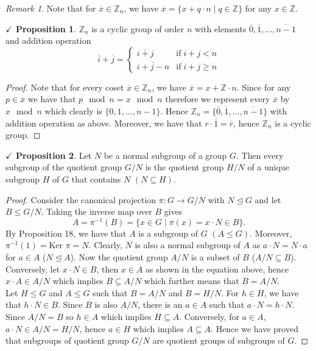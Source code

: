 \documentclass{article}
\theoremstyle{definition}
\theoremstyle{remark}
\newtheorem*{remark}{Remark}
\theoremstyle{definition}
\theoremstyle{definition}
\newtheorem{proposition}{$\checkmark$ Proposition}
\theoremstyle{definition}
\theoremstyle{proof}
\newcommand{\inv}[1]{#1^{-1}}
\newcommand{\kernel}[0]{\text{Ker }}
\newcommand{\nsg}[0]{\trianglelefteq}
\begin{document}
\begin{remark}
	Note that for $ \overline{x} \in \mathbb{Z}_n $, we have $ \overline{x} = \{x+q\cdot n\;\vert\; q\in \mathbb{Z}\} $ for any $ x \in \mathbb{Z} $.
\end{remark}
\hrulefill
\begin{proposition}
	$ \mathbb{Z}_n $ is a cyclic group  of order $ n $ with elements $ \overline{0}, \overline{1}, \dots, \overline{n-1} $ and addition operation
	\[\overline{i} + \overline{j} = \begin{cases}
		\overline{i+j}&\text{if} \;i+j < n\\
		\overline{i+j-n}&\text{if}\; i+j\ge n
	\end{cases}\]
\end{proposition}
\begin{proof}
	Note that for every coset $ \overline{x} \in \mathbb{Z}_n $, we have $ \overline{x} = x + \mathbb{Z}\cdot n $. Since for any $ p \in \overline{x} $ we have that $ p\mod n = x\mod n $ therefore we represent every $ \overline{x} $ by $ x\mod n $ which clearly is $ \{0,1,\dots,n-1\} $. Hence $ \mathbb{Z}_n =  \{\overline{0}, \overline{1}, \dots, \overline{n-1} \} $ with addition operation as above. Moreover, we have that $ r\cdot \overline{1} = \overline{r} $, hence $ \mathbb{Z}_n $ is a cyclic group.
\end{proof}
\hrulefill
\begin{proposition}
	Let $ N $ be a normal subgroup of a group $ G $. Then every subgroup of the quotient group $ G/N $ is the quotient group $ H/N $ of a unique subgroup $ H $ of $ G $ that contains $ N $ $ (N\subseteq H) $.
\end{proposition}
\begin{proof}
	Consider the canonical projection $ \pi : G\to G/N $ with $ N \nsg G $ and let $ B \le G/N $. Taking the inverse map over $ B $ gives
	\[A = \inv{\pi}(B) = \{x\in G \;\vert\; \pi(x) = x\cdot N\in B \}.\]
	By Proposition 18, we have that $ A $ is a subgroup of $ G $ $ (A\le G) $. Moreover, $ \inv{\pi}(1) = \kernel\pi = N $. Clearly, $ N $ is also a normal subgroup of $ A $ as $ a\cdot N = N\cdot a $ for $ a\in A $ ($ N\nsg A $). Now the quotient group $ A/N $ is a subset of $ B $ ($ A/N \subseteq B $). Conversely, let $ x\cdot N \in B $, then $ x\in A $ as shown in the equation above, hence $ x\cdot A \in A/N $ which implies $ B\subseteq A/N $ which further means that $ B = A/N $.\\
	Let $ H\le G $ and $ A\le G $ such that $ B = A/N $ and $ B = H/N $. For $ h\in H $, we have that $ h\cdot N \in B $. Since $ B $ is also $ A/N $, there is an $ a \in A $ such that $ a\cdot N = h\cdot N $. Since $ A/N = B$ so $ h\in A $ which implies $ H\subseteq A $. Conversely, for $ a\in A $, $ a\cdot N \in A/N = H/N$, hence $ a\in H $ which implies $ A\subseteq A $. Hence we have proved that subgroups of quotient group $ G/N $ are quotient groups of subgroups of $ G $.  
\end{proof}
\end{document}
